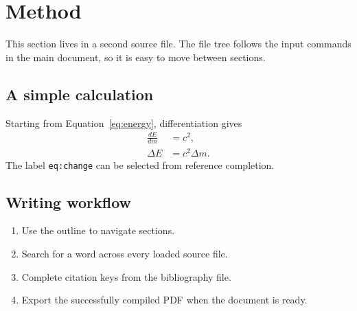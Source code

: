 \section{Method}
\label{sec:method}

This section lives in a second source file. The file tree follows the input
commands in the main document, so it is easy to move between sections.

\subsection{A simple calculation}
Starting from Equation~\eqref{eq:energy}, differentiation gives
\begin{align}
  \frac{dE}{dm} &= c^2, \\
  \Delta E &= c^2\Delta m.
  \label{eq:change}
\end{align}
The label \texttt{eq:change} can be selected from reference completion.

\subsection{Writing workflow}
\begin{enumerate}
  \item Use the outline to navigate sections.
  \item Search for a word across every loaded source file.
  \item Complete citation keys from the bibliography file.
  \item Export the successfully compiled PDF when the document is ready.
\end{enumerate}

